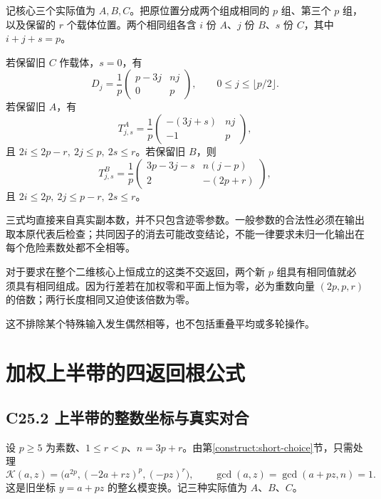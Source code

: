 \documentclass[11pt,a4paper]{article}
\theoremstyle{definition}
\numberwithin{equation}{section}
\begin{document}
{记核心三个实际值为} \(A,B,C\){。把原位置分成两个组成相同的} \(p\) {组、第三个} \(p\) {组，以及保留的} \(r\) {个载体位置。两个相同组各含} \(i\) {份} \(A\){、}\(j\) {份} \(B\){、}\(s\) {份} \(C\){，其中} \(i+j+s=p\){。}

{若保留旧} \(C\) {作载体，}\(s=0\){，有} \[
D_j=\frac1p\begin{pmatrix}p-3j&nj\\0&p\end{pmatrix},
\qquad 0\le j\le\lfloor p/2\rfloor.
\tag{C24.3}
\] {若保留旧} \(A\){，有} \[
T^A_{j,s}=\frac1p\begin{pmatrix}-(3j+s)&nj\\-1&p\end{pmatrix},
\tag{C24.4}
\] {且} \(2i\le2p-r,\ 2j\le p,\ 2s\le r\){。若保留旧} \(B\){，则} \[
T^B_{j,s}=\frac1p\begin{pmatrix}3p-3j-s&n(j-p)\\2&-(2p+r)\end{pmatrix},
\tag{C24.5}
\] {且} \(2i\le2p,\ 2j\le p-r,\ 2s\le r\){。}

{三式均直接来自真实副本数，并不只包含迹零参数。一般参数的合法性必须在输出取本原代表后检查；共同因子的消去可能改变结论，不能一律要求未归一化输出在每个危险素数处都不全相等。}

{对于要求在整个二维核心上恒成立的这类不交返回，两个新} \(p\) {组具有相同值就必须具有相同组成。因为行差若在加权零和平面上恒为零，必为重数向量} \((2p,p,r)\) {的倍数；两行长度相同又迫使该倍数为零。}

{这不排除某个特殊输入发生偶然相等，也不包括重叠平均或多轮操作。}


\section{加权上半带的四返回根公式}\label{construct:upper-four}
\subsection*{\texorpdfstring{{C25.2} {上半带的整数坐标与真实对合}}{C25.2 上半带的整数坐标与真实对合}}\label{C25-h155}

{设} {\ensuremath{p\ge 5}} {为素数、\ensuremath{1\le r<p}、\ensuremath{n=3p+r}。由}第\ref{construct:short-choice}节{，只需处理} \[
\mathcal K(a,z)=\bigl(a^{2p},(-2a+rz)^p,(-pz)^r\bigr),
\qquad \gcd(a,z)=\gcd(a+pz,n)=1.
\tag{C25.1}
\] {这是旧坐标} {\ensuremath{y=a+pz}} {的整幺模变换。记三种实际值为} {\ensuremath{A}、\ensuremath{B}、\ensuremath{C}。}
\end{document}
